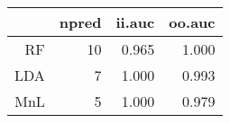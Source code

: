 \begin{table}[ht]
\centering
\begin{tabular}{rrrr}
  \hline
 & npred & ii.auc & oo.auc \\ 
  \hline
RF &   10 & 0.965 & 1.000 \\ 
  LDA &    7 & 1.000 & 0.993 \\ 
  MnL &    5 & 1.000 & 0.979 \\ 
   \hline
\end{tabular}
\label{tab:second_res}
\end{table}
